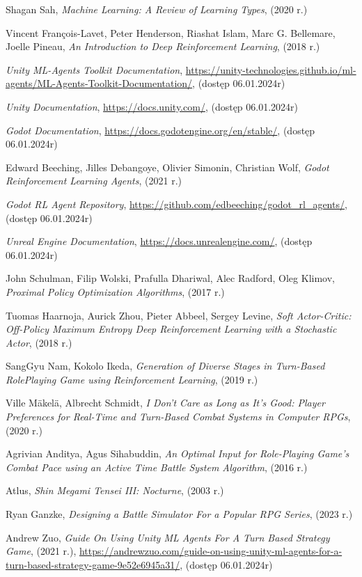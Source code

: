 \documentclass{SGGW-thesis}
\begin{document}
\begin{thebibliography}{9}
  Shagan Sah,
  \textit{Machine Learning: A Review of Learning Types},
  (2020 r.)

  Vincent François-Lavet, Peter Henderson, Riashat Islam, Marc G. Bellemare, Joelle Pineau,
  \textit{An Introduction to Deep Reinforcement Learning},
  (2018 r.)

  \textit{Unity ML-Agents Toolkit Documentation},
  \url{https://unity-technologies.github.io/ml-agents/ML-Agents-Toolkit-Documentation/},
  (dostęp 06.01.2024r)

  \textit{Unity Documentation},
  \url{https://docs.unity.com/},
  (dostęp 06.01.2024r)

  \textit{Godot Documentation},
  \url{https://docs.godotengine.org/en/stable/},
  (dostęp 06.01.2024r)

  Edward Beeching, Jilles Debangoye, Olivier Simonin, Christian Wolf,
  \textit{Godot Reinforcement Learning Agents},
  (2021 r.)

  \textit{Godot RL Agent Repository},
  \url{https://github.com/edbeeching/godot_rl_agents/},
  (dostęp 06.01.2024r)

  \textit{Unreal Engine Documentation},
  \url{https://docs.unrealengine.com/},
  (dostęp 06.01.2024r)
  
  John Schulman, Filip Wolski, Prafulla Dhariwal, Alec Radford, Oleg Klimov, 
  \textit{Proximal Policy Optimization Algorithms},
  (2017 r.)

  Tuomas Haarnoja, Aurick Zhou, Pieter Abbeel, Sergey Levine, 
  \textit{Soft Actor-Critic: Off-Policy Maximum Entropy Deep Reinforcement Learning with a Stochastic Actor},
  (2018 r.)

  SangGyu Nam, Kokolo Ikeda,
  \textit{Generation of Diverse Stages in Turn-Based RolePlaying Game using Reinforcement Learning},
  (2019 r.)

  Ville Mäkelä, Albrecht Schmidt,
  \textit{I Don’t Care as Long as It’s Good: Player Preferences for
  Real-Time and Turn-Based Combat Systems in Computer RPGs},
  (2020 r.)

  Agrivian Anditya, Agus Sihabuddin,
  \textit{An Optimal Input for Role-Playing Game’s
  Combat Pace using an Active Time Battle System
  Algorithm},
  (2016 r.)

  Atlus,
  \textit{Shin Megami Tensei III: Nocturne},
  (2003 r.)

  Ryan Ganzke,
  \textit{Designing a Battle Simulator For a Popular RPG Series},
  (2023 r.)

  Andrew Zuo,
  \textit{Guide On Using Unity ML Agents For A Turn Based Strategy Game},
  (2021 r.),
  \url{https://andrewzuo.com/guide-on-using-unity-ml-agents-for-a-turn-based-strategy-game-9e52e6945a31/},
  (dostęp 06.01.2024r)
\end{thebibliography}

\beforelastpage
\end{document}
